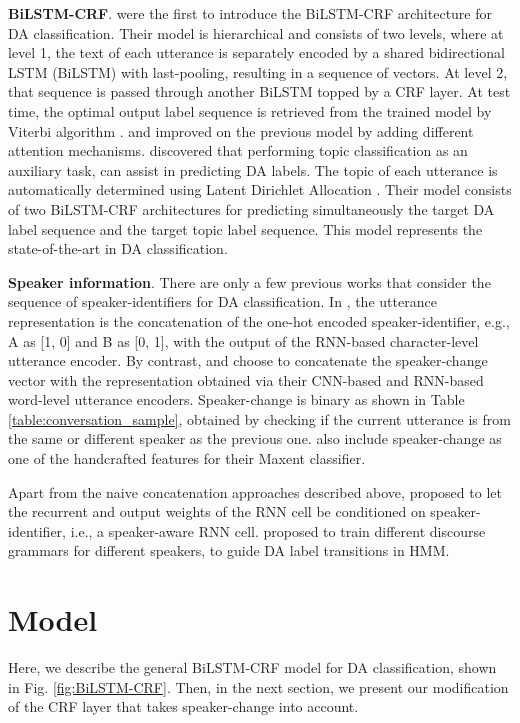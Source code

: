 \documentclass[11pt,a4paper]{article}
\begin{document}
\noindent\textbf{BiLSTM-CRF}.
\citet{kumar2018dialogue} were the first to introduce the BiLSTM-CRF architecture for DA classification.
Their model is hierarchical and consists of two levels, where at level 1, the text of each utterance is separately encoded by a shared bidirectional LSTM (BiLSTM) with last-pooling, resulting in a sequence of vectors.
At level 2, that sequence is passed through another BiLSTM topped by a CRF layer.
At test time, the optimal output label sequence is retrieved from the trained model by Viterbi algorithm \citep{viterbi1967error}.
\citet{chen2018dialogue} and \citet{raheja-tetreault-2019-dialogue} improved on the previous model by adding different attention mechanisms. \citet{li-etal-2019-dual} discovered that performing topic classification as an auxiliary task, can assist in predicting DA labels.
The topic of each utterance is automatically determined using Latent Dirichlet Allocation \citep{blei2003latent}.
Their model consists of two BiLSTM-CRF architectures for predicting simultaneously the target DA label sequence and the target topic label sequence.
This model represents the state-of-the-art in DA classification. 

\noindent\textbf{Speaker information}.
There are only a few previous works that consider the sequence of speaker-identifiers for DA classification.
In \citep{bothe-etal-2018-context}, the utterance representation is the concatenation of the one-hot encoded speaker-identifier, e.g., A as [1, 0] and B as [0, 1], with the output of the RNN-based character-level utterance encoder.
By contrast, \citet{li-wu-2016-multi} and \citet{liu-etal-2017-using-context} choose to concatenate the speaker-change vector with the representation obtained via their CNN-based and RNN-based word-level utterance encoders.
Speaker-change is binary as shown in Table \ref{table:conversation_sample}, obtained by checking if the current utterance is from the same or different speaker as the previous one.
\citet{venkataraman2005does} also include speaker-change as one of the handcrafted features for their Maxent classifier.

Apart from the naive concatenation approaches described above, \citet{kalchbrenner2013recurrent} proposed to let the recurrent and output weights of the RNN cell be conditioned on speaker-identifier, i.e., a speaker-aware RNN cell.
\citet{stolcke-etal-2000-dialogue} proposed to train different discourse grammars for different speakers, to guide DA label transitions in HMM.

\section{Model}\label{sec:model}
Here, we describe the general BiLSTM-CRF model for DA classification, shown in Fig. \ref{fig:BiLSTM-CRF}. Then, in the next section, we present our modification of the CRF layer that takes speaker-change into account.
\end{document}
